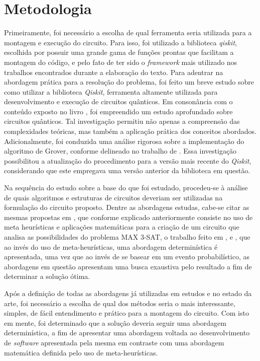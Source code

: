 \documentclass[12pt]{article}
\begin{document}
\section{Metodologia}\label{sec:metodologia}
Primeiramente, foi necessário a escolha de qual ferramenta seria utilizada para a montagem e execução do circuito. Para isso, foi utilizado a biblioteca \textit{qiskit}, escolhida por possuir uma grande gama de funções prontas que facilitam a montagem do código, e pelo fato de ter sido o \textit{framework} mais utilizado nos trabalhos encontrados durante a elaboração do texto.
Para adentrar na abordagem prática para a resolução do problema, foi feito 
um breve estudo sobre como utilizar a biblioteca \textit{Qiskit}, ferramenta altamente utilizada para 
desenvolvimento e execução de circuitos quânticos. Em consonância com o 
conteúdo exposto no livro \cite{silva:18}, foi empreendido um estudo 
aprofundado sobre circuitos quânticos. Tal investigação permitiu não apenas 
a compreensão das complexidades teóricas, mas também a aplicação prática dos 
conceitos abordados. Adicionalmente, foi conduzida uma análise rigorosa 
sobre a implementação do algoritmo de Grover, conforme delineado no trabalho 
de \cite{gamberi:22}. Essa investigação possibilitou a atualização do 
procedimento para a versão mais recente do \textit{Qiskit}, considerando que este empregava uma versão anterior da 
biblioteca em questão. 

Na sequência do estudo sobre a base do que foi estudado, procedeu-se à análise de quais algoritmos e estruturas de circuitos deveriam ser utilizadas na formulação do circuito proposto. Dentre as abordagens estudas, cabe-se citar as mesmas propostas em \cite{mandl:24}, que conforme explicado anteriormente consiste no uso de meta heurísticas e aplicações matemáticas para a criação de um circuito que analisa as possibilidades do problema MAX 3-SAT, o trabalho feito em \cite{fernandes:19}, \cite{parallelAndDistributed} e \cite{wang:20}, que ao invés do uso de meta-heurísticas, uma abordagem determinística é apresentada, uma vez que ao invés de se basear em um evento probabilístico, as abordagens em questão apresentam uma busca exaustiva pelo resultado a fim de determinar a solução ótima.

Após a definição de todas as abordagens já utilizadas em estudos e no estado da arte, foi necessário a escolha de qual dos métodos seria o mais interessante, simples, de fácil entendimento e prático para a montagem do circuito. Com isto em mente, foi determinado que a solução deveria seguir uma abordagem determinística, a fim de apresentar uma abordagem voltada ao desenvolvimento de \textit{software} apresentada pela mesma em contraste com uma abordagem matemática definida pelo uso de meta-heurísticas.
\end{document}
